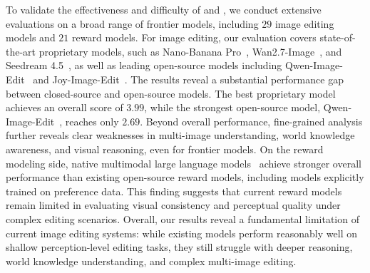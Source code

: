 To validate the effectiveness and difficulty of {\bench} and {\rmbench}, we conduct extensive evaluations on a broad range of frontier models, including $29$ image editing models and $21$ reward models.
For image editing, our evaluation covers state-of-the-art proprietary models, such as Nano-Banana Pro~\cite{nanobananapro}, Wan2.7-Image~\cite{wan}, and Seedream 4.5~\cite{seedream2025seedream}, as well as leading open-source models including Qwen-Image-Edit~\cite{wu2025qwen} and Joy-Image-Edit~\cite{joyaiimage2026}.
The results reveal a substantial performance gap between closed-source and open-source models.
The best proprietary model achieves an overall score of $3.99$, while the strongest open-source model, Qwen-Image-Edit~\cite{wu2025qwen}, reaches only $2.69$.
Beyond overall performance, fine-grained analysis further reveals clear weaknesses in multi-image understanding, world knowledge awareness, and visual reasoning, even for frontier models.
On the reward modeling side, native multimodal large language models~\cite{qwen3.5,qwen36_35b_a3b,zhang2025debiasing,wang2025monet,qwen3.6-27b,shi2025mavors} achieve stronger overall performance than existing open-source reward models, including models explicitly trained on preference data.
This finding suggests that current reward models remain limited in evaluating visual consistency and perceptual quality under complex editing scenarios.
Overall, our results reveal a fundamental limitation of current image editing systems: while existing models perform reasonably well on shallow perception-level editing tasks, they still struggle with deeper reasoning, world knowledge understanding, and complex multi-image editing.